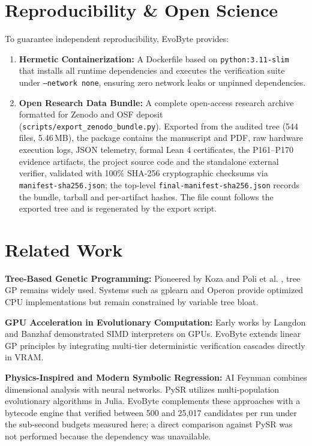 \documentclass[11pt,a4paper]{article}
\begin{document}
\section{Reproducibility \& Open Science}
To guarantee independent reproducibility, EvoByte provides:
\begin{enumerate}
    \item \textbf{Hermetic Containerization:} A Dockerfile based on \texttt{python:3.11-slim} that installs all runtime dependencies and executes the verification suite under \texttt{--network none}, ensuring zero network leaks or unpinned dependencies.
    \item \textbf{Open Research Data Bundle:} A complete open-access research archive formatted for Zenodo and OSF deposit (\texttt{scripts/export\_zenodo\_bundle.py}). Exported from the audited tree (544 files, 5.46\,MB), the package contains the manuscript and PDF, raw hardware execution logs, JSON telemetry, formal Lean 4 certificates, the P161--P170 evidence artifacts, the project source code and the standalone external verifier, validated with 100\% SHA-256 cryptographic checksums via \texttt{manifest-sha256.json}; the top-level \texttt{final-manifest-sha256.json} records the bundle, tarball and per-artifact hashes. The file count follows the exported tree and is regenerated by the export script.
\end{enumerate}

\section{Related Work}
\textbf{Tree-Based Genetic Programming:} Pioneered by Koza \cite{koza1992genetic} and Poli et al. \cite{poli2008field}, tree GP remains widely used. Systems such as gplearn and Operon provide optimized CPU implementations but remain constrained by variable tree bloat.

\textbf{GPU Acceleration in Evolutionary Computation:} Early works by Langdon and Banzhaf \cite{langdon2008simd} demonstrated SIMD interpreters on GPUs. EvoByte extends linear GP principles \cite{miller2000cartesian} by integrating multi-tier deterministic verification cascades directly in VRAM.

\textbf{Physics-Inspired and Modern Symbolic Regression:} AI Feynman \cite{udrescu2020ai} combines dimensional analysis with neural networks. PySR \cite{cranmer2023interpretable} utilizes multi-population evolutionary algorithms in Julia. EvoByte complements these approaches with a bytecode engine that verified between 500 and 25{,}017 candidates per run under the sub-second budgets measured here; a direct comparison against PySR was not performed because the dependency was unavailable.
\end{document}
